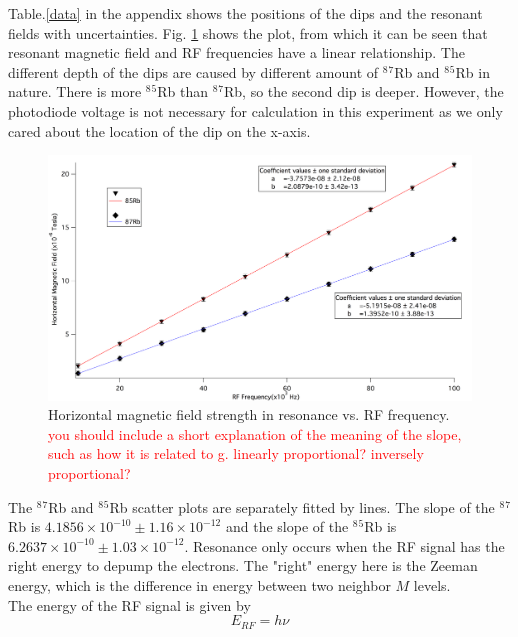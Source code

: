 \documentclass[prb,preprint]{revtex4-1}
\begin{document}
Table.\ref{data} in the appendix shows the positions of the dips and the resonant fields with uncertainties. Fig. \ref{both} shows the plot, from which it can be seen that resonant magnetic field and RF frequencies have a linear relationship. The different depth of the dips are caused by different amount of $^8$$^7$Rb and $^8$$^5$Rb in nature. There is more $^8$$^5$Rb than $^8$$^7$Rb, so the second dip is deeper. However, the photodiode voltage is not necessary for calculation in this experiment as we only cared about the location of the dip on the x-axis.


\begin{figure}[h]
\centering
\includegraphics[width=16cm]{slopegraph.png}
\caption{Horizontal magnetic field strength in resonance vs. RF frequency. \textcolor{red}{you should include a short explanation of the meaning of the slope, such as how it is related to g. linearly proportional? inversely proportional?} }
\label{both}
\end{figure}

The $^8$$^7$Rb and $^8$$^5$Rb scatter plots are separately fitted by lines. The slope of the $^8$$^7$Rb is $4.1856\times 10^{-10} \pm 1.16 \times 10^{-12}$ and the slope of the $^8$$^5$Rb is $6.2637 \times 10^{-10} \pm 1.03 \times 10^{-12}$. Resonance only occurs when the RF signal has the right energy to depump the electrons. The "right" energy here is the Zeeman energy, which is the difference in energy between two neighbor $M$ levels. \\

The energy of the RF signal is given by
\begin{equation}
E_{RF}=h\nu
\label{rfenergy}
\end{equation}
\end{document}
